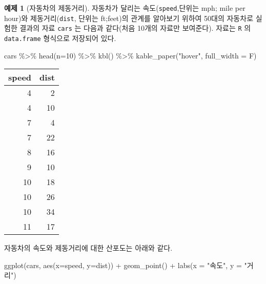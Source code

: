 \documentclass[
]{book}
\newenvironment{Shaded}{\begin{snugshade}}{\end{snugshade}}
\newcommand{\AttributeTok}[1]{\textcolor[rgb]{0.77,0.63,0.00}{#1}}
\newcommand{\DecValTok}[1]{\textcolor[rgb]{0.00,0.00,0.81}{#1}}
\newcommand{\FunctionTok}[1]{\textcolor[rgb]{0.00,0.00,0.00}{#1}}
\newcommand{\NormalTok}[1]{#1}
\newcommand{\SpecialCharTok}[1]{\textcolor[rgb]{0.00,0.00,0.00}{#1}}
\newcommand{\StringTok}[1]{\textcolor[rgb]{0.31,0.60,0.02}{#1}}
\theoremstyle{definition}
\theoremstyle{definition}
\newtheorem{example}{예제}[chapter]
\theoremstyle{definition}
\theoremstyle{remark}
\begin{document}
\begin{example}[자동차의 제동거리]
\protect\hypertarget{exm:unnamed-chunk-4}{}{\label{exm:unnamed-chunk-4} \iffalse (자동차의 제동거리) \fi{} }
자동차가 달리는 속도(\texttt{speed},단위는 mph; mile per hour)와 제동거리(\texttt{dist}, 단위는 ft;feet)의 관계를 알아보기 위하여 50대의 자동차로 실험한 결과의 자료 \texttt{cars} 는 다음과 같다(처음 10개의 자료만 보여준다). 자료는 \texttt{R} 의 \texttt{data.frame} 형식으로 저장되어 있다.
\end{example}

\begin{Shaded}
\begin{Highlighting}[]
\NormalTok{cars }\SpecialCharTok{\%\textgreater{}\%} \FunctionTok{head}\NormalTok{(}\AttributeTok{n=}\DecValTok{10}\NormalTok{) }\SpecialCharTok{\%\textgreater{}\%} \FunctionTok{kbl}\NormalTok{() }\SpecialCharTok{\%\textgreater{}\%}  \FunctionTok{kable\_paper}\NormalTok{(}\StringTok{"hover"}\NormalTok{, }\AttributeTok{full\_width =}\NormalTok{ F)}
\end{Highlighting}
\end{Shaded}

\begin{table}
\centering
\begin{tabular}[t]{r|r}
\hline
speed & dist\\
\hline
4 & 2\\
\hline
4 & 10\\
\hline
7 & 4\\
\hline
7 & 22\\
\hline
8 & 16\\
\hline
9 & 10\\
\hline
10 & 18\\
\hline
10 & 26\\
\hline
10 & 34\\
\hline
11 & 17\\
\hline
\end{tabular}
\end{table}

자동차의 속도와 제동거리에 대한 산포도는 아래와 같다.

\begin{Shaded}
\begin{Highlighting}[]
\FunctionTok{ggplot}\NormalTok{(cars, }\FunctionTok{aes}\NormalTok{(}\AttributeTok{x=}\NormalTok{speed, }\AttributeTok{y=}\NormalTok{dist)) }\SpecialCharTok{+} \FunctionTok{geom\_point}\NormalTok{() }\SpecialCharTok{+} \FunctionTok{labs}\NormalTok{(}\AttributeTok{x =} \StringTok{"속도"}\NormalTok{, }\AttributeTok{y =} \StringTok{"거리"}\NormalTok{)}
\end{Highlighting}
\end{Shaded}
\end{document}
